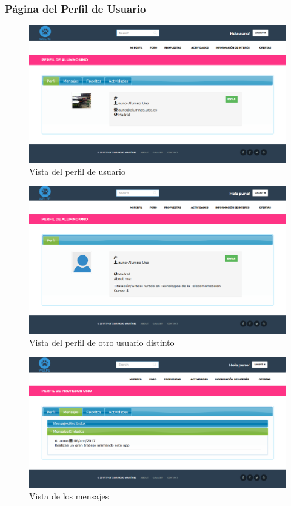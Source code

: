 \subsubsection{Página del Perfil de Usuario}
\label{subsubsec:profile}
\begin{figure}[H]
\centering
\includegraphics[width=12cm]{img/mi_perfil}
\caption{Vista del perfil de usuario}
\label{figura:perfil_usuario}
\end{figure}
\begin{figure}[H]
\centering
\includegraphics[width=12cm]{img/perfil_otro}
\caption{Vista del perfil de otro usuario distinto}
\label{figura:perfil_otro_usuario}
\end{figure}
\begin{figure}[H]
\centering
\includegraphics[width=12cm]{img/perfil_mensajes}
\caption{Vista de los mensajes}
\label{figura:perfil_mensajes}
\end{figure}
